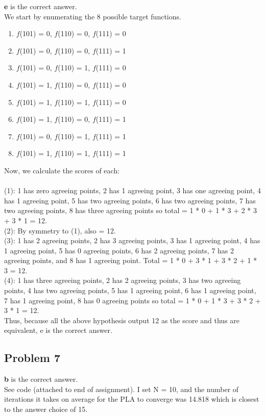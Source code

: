 \documentclass[12 pt]{article}
\begin{document}
	\textbf{e} is the correct answer.\\
	We start by enumerating the 8 possible target functions. 
	\begin{enumerate}
		\item $f$(101) = 0, $f$(110) = 0, $f$(111) = 0
		\item $f$(101) = 0, $f$(110) = 0, $f$(111) = 1
		\item $f$(101) = 0, $f$(110) = 1, $f$(111) = 0
		\item $f$(101) = 1, $f$(110) = 0, $f$(111) = 0
		\item $f$(101) = 1, $f$(110) = 1, $f$(111) = 0
		\item $f$(101) = 1, $f$(110) = 0, $f$(111) = 1
		\item $f$(101) = 0, $f$(110) = 1, $f$(111) = 1
		\item $f$(101) = 1, $f$(110) = 1, $f$(111) = 1
	\end{enumerate}
	Now, we calculate the scores of each: \\ \\
	(1): 1 has zero agreeing points, 2 has 1 agreeing point, 3 has one agreeing point, 4 has 1 agreeing point, 5 has two agreeing points, 6 has two agreeing points, 7 has two agreeing points, 8 has three agreeing points so total = 1 * 0 + 1 * 3 + 2 * 3 + 3 * 1 = 12. \\
	(2): By symmetry to (1), also = 12. \\
	(3): 1 has 2 agreeing points, 2 has 3 agreeing points, 3 has 1 agreeing point, 4 has 1 agreeing point, 5 has 0 agreeing points, 6 has 2 agreeing points, 7 has 2 agreeing points, and 8 has 1 agreeing point. Total = 1 * 0 + 3 * 1 + 3 * 2 + 1 * 3 = 12. \\
	(4): 1 has three agreeing points, 2 has 2 agreeing points, 3 has two agreeing points, 4 has two agreeing points, 5 has 1 agreeing point, 6 has 1 agreeing point, 7 has 1 agreeing point, 8 has 0 agreeing points so total = 1 * 0 + 1 * 3 + 3 * 2 + 3 * 1 = 12. \\ 
	
	\noindent Thus, because all the above hypothesis output 12 as the score and thus are equivalent, e is the correct answer.
	
		
	\subsection*{Problem 7}
		
	\textbf{b} is the correct answer.\\
	See code (attached to end of assignment). I set N = 10, and the number of iterations it takes on average for the PLA to converge was 14.818 which is closest to the answer choice of 15.
	
\end{document}
